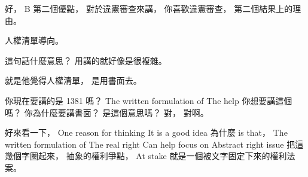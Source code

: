 \hypertarget{w06:cue:2515}{}好，
\hypertarget{w06:cue:2516}{}B 第二個優點，
\hypertarget{w06:cue:2517}{}對於違憲審查來講，
\hypertarget{w06:cue:2518}{}你喜歡違憲審查，
\hypertarget{w06:cue:2519}{}第二個結果上的理由。

\hypertarget{w06:cue:2520}{}人權清單導向。

\hypertarget{w06:cue:2521}{}這句話什麼意思？
\hypertarget{w06:cue:2522}{}用講的就好像是很複雜。

\hypertarget{w06:cue:2523}{}就是他覺得人權清單，
\hypertarget{w06:cue:2524}{}是用書面去。

\hypertarget{w06:cue:2525}{}你現在要講的是 1381 嗎？
\hypertarget{w06:cue:2526}{}The written formulation of
\hypertarget{w06:cue:2527}{}The help
\hypertarget{w06:cue:2528}{}你想要講這個嗎？
\hypertarget{w06:cue:2529}{}你為什麼要講書面？
\hypertarget{w06:cue:2530}{}是這個意思嗎？
\hypertarget{w06:cue:2531}{}對，
\hypertarget{w06:cue:2532}{}對啊。

\hypertarget{w06:cue:2533}{}好來看一下，
\hypertarget{w06:cue:2534}{}One reason for thinking
\hypertarget{w06:cue:2535}{}It is a good idea
\hypertarget{w06:cue:2536}{}為什麼 is that，
\hypertarget{w06:cue:2537}{}The written formulation of
\hypertarget{w06:cue:2538}{}The real right
\hypertarget{w06:cue:2539}{}Can help focus on
\hypertarget{w06:cue:2540}{}Abstract right issue
\hypertarget{w06:cue:2541}{}把這幾個字圈起來，
\hypertarget{w06:cue:2542}{}抽象的權利爭點，
\hypertarget{w06:cue:2543}{}At stake
\hypertarget{w06:cue:2544}{}就是一個被文字固定下來的權利法案。

